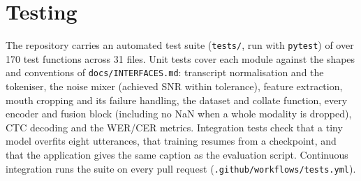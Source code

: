 \section{Testing}
\label{sec:testing}
The repository carries an automated test suite (\texttt{tests/}, run with \texttt{pytest}) of
over 170 test functions across 31 files. Unit tests cover each module against the shapes and
conventions of \texttt{docs/INTERFACES.md}: transcript normalisation and the tokeniser, the
noise mixer (achieved SNR within tolerance), feature extraction, mouth cropping and its failure
handling, the dataset and collate function, every encoder and fusion block (including no NaN
when a whole modality is dropped), CTC decoding and the WER/CER metrics. Integration tests check
that a tiny model overfits eight utterances, that training resumes from a checkpoint, and that
the application gives the same caption as the evaluation script. Continuous integration runs
the suite on every pull request (\texttt{.github/workflows/tests.yml}).
